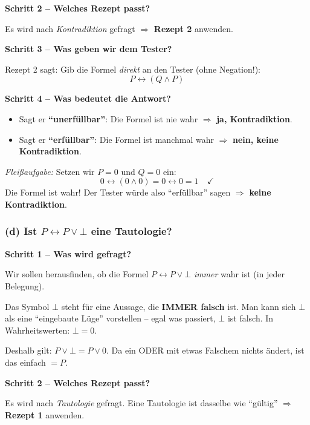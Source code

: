 \documentclass[a4paper,12pt]{article}
\begin{document}
\textbf{Schritt 2 -- Welches Rezept passt?}

Es wird nach \emph{Kontradiktion} gefragt $\Rightarrow$ \textbf{Rezept 2} anwenden.

\medskip
\textbf{Schritt 3 -- Was geben wir dem Tester?}

Rezept 2 sagt: Gib die Formel \emph{direkt} an den Tester (ohne Negation!):
\[
  P \leftrightarrow (Q \wedge P)
\]

\textbf{Schritt 4 -- Was bedeutet die Antwort?}
\begin{itemize}
\item Sagt er \textbf{"`unerf\"ullbar"'}: Die Formel ist nie wahr
      $\Rightarrow$ \textbf{ja, Kontradiktion}.
\item Sagt er \textbf{"`erf\"ullbar"'}: Die Formel ist manchmal wahr
      $\Rightarrow$ \textbf{nein, keine Kontradiktion}.
\end{itemize}

\medskip
\textit{Flei\ss aufgabe:} Setzen wir $P = 0$ und $Q = 0$ ein:
\[
  0 \leftrightarrow (0 \wedge 0) = 0 \leftrightarrow 0 = 1 \quad\checkmark
\]
Die Formel ist wahr! Der Tester w\"urde also "`erf\"ullbar"' sagen
$\Rightarrow$ \textbf{keine Kontradiktion}.

\subsubsection*{(d) Ist $P \leftrightarrow P \vee \bot$ eine Tautologie?}

\textbf{Schritt 1 -- Was wird gefragt?}

Wir sollen herausfinden, ob die Formel $P \leftrightarrow P \vee \bot$
\emph{immer} wahr ist (in jeder Belegung).

\begin{merkbox}[title={Was ist $\bot$ (Bottom/Falsum)?}]
Das Symbol $\bot$ steht f\"ur eine Aussage, die \textbf{IMMER falsch} ist.
Man kann sich $\bot$ als eine "`eingebaute L\"uge"' vorstellen -- egal
was passiert, $\bot$ ist falsch. In Wahrheitswerten: $\bot = 0$.

\medskip
Deshalb gilt: $P \vee \bot = P \vee 0$. Da ein ODER mit etwas Falschem
nichts \"andert, ist das einfach $= P$.
\end{merkbox}

\textbf{Schritt 2 -- Welches Rezept passt?}

Es wird nach \emph{Tautologie} gefragt. Eine Tautologie ist dasselbe wie
"`g\"ultig"' $\Rightarrow$ \textbf{Rezept 1} anwenden.
\end{document}
